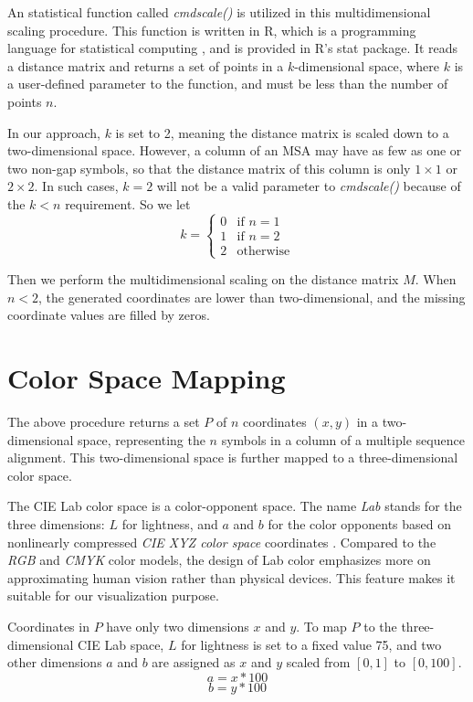 An statistical function called \emph{cmdscale()} \cite{R2009aa} is utilized in this multidimensional scaling procedure. This function is written in R, which is a programming language for statistical computing \cite{Gentleman:aa}, and is provided in R’s stat package. It reads a distance matrix and returns a set of points in a $k$-dimensional space, where $k$ is a user-defined parameter to the function, and must be less than the number of points $n$. \cite{Cailliez:1983aa,Cox:2008aa}

In our approach, $k$ is set to 2, meaning the distance matrix is scaled down to a two-dimensional space. However, a column of an MSA may have as few as one or two non-gap symbols, so that the distance matrix of this column is only $1 \times 1$ or $2 \times 2$. In such cases, $k=2$ will not be a valid parameter to \emph{cmdscale()} because of the $k<n$ requirement. So we let
\[
k = \left\{ \begin{array}{ll}
0 & \mbox{if $n=1$} \\
1 & \mbox{if $n=2$} \\
2 & \mbox{otherwise}
\end{array}
\right.
\]

Then we perform the multidimensional scaling on the distance matrix $M$. When $n<2$, the generated coordinates are lower than two-dimensional, and the missing coordinate values are filled by zeros.

\section{Color Space Mapping}

The above procedure returns a set $P$ of $n$ coordinates $(x,y)$ in a two-dimensional space, representing the $n$ symbols in a column of a multiple sequence alignment. This two-dimensional space is further mapped to a three-dimensional color space.

The CIE Lab color space \cite {McLAREN:1976aa} is a color-opponent space. The name \emph{Lab} stands for the three dimensions: $L$ for lightness, and $a$ and $b$ for the color opponents based on nonlinearly compressed \emph{CIE XYZ color space} coordinates \cite{CIE:1932aa,Smith:1931aa}. Compared to the \emph{RGB} and \emph{CMYK} color models, the design of Lab color emphasizes more on approximating human vision rather than physical devices. This feature makes it suitable for our visualization purpose. \cite{Margulis:2005aa}

Coordinates in $P$ have only two dimensions $x$ and $y$. To map $P$ to the three-dimensional CIE Lab space, $L$ for lightness is set to a fixed value 75, and two other dimensions $a$ and $b$ are assigned as $x$ and $y$ scaled from $[0,1]$ to $[0, 100]$. $$a=x*100$$ $$b=y*100$$

